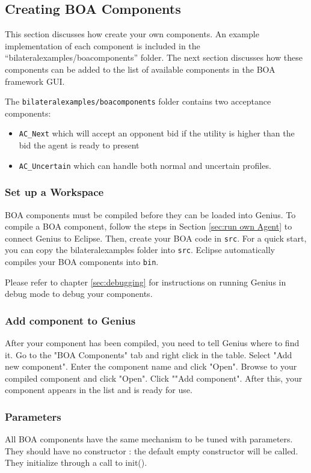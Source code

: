 \documentclass[]{llncs}
\newcommand\Genius{{\sc Genius}}
\begin{document}
\subsection{Creating BOA Components} \label{sec:creating-boa-components}
This section discusses how create your own components. An example implementation of each component is included in the ``bilateralexamples/boacomponents'' folder. The next section discusses how these components can be added to the list of available components in the BOA framework GUI. 

The \verb|bilateralexamples/boacomponents| folder contains two acceptance components:
\begin{itemize}
\item \verb|AC_Next| which  will accept an opponent bid if the utility is higher than the bid the agent is ready to present
\item \verb|AC_Uncertain| which can handle both normal and uncertain profiles.
\end{itemize}

\subsubsection{Set up a Workspace}
BOA components must be compiled before they can be loaded into {\Genius}.
To compile a BOA component, follow the steps in Section \ref{sec:run own Agent} to connect {\Genius} to Eclipse. Then, create your BOA code in \verb|src|. For a quick start, you can copy the bilateralexamples folder into \verb|src|. Eclipse automatically compiles your BOA components into \verb|bin|.

Please refer to chapter \ref{sec:debugging} for instructions on running {\Genius} in debug mode to debug your components. 

\subsubsection{Add component to {\Genius}}
After your component has been compiled, you need to tell {\Genius} where to find it.
Go to the "BOA Components" tab and right click in the table. Select "Add new component". Enter the component name and click "Open". Browse to your compiled component and click "Open". Click ""Add component". After this, your component appears in the list and is ready for use.  

\subsubsection{Parameters}
All BOA components have the same mechanism to be tuned with parameters. They should have no constructor : the default empty constructor will be called. They initialize through a call to init().
\end{document}

